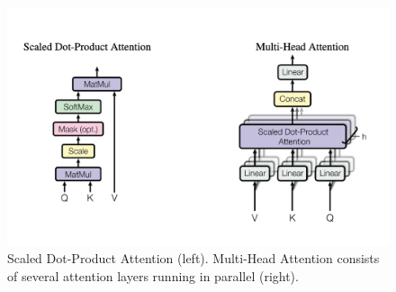 \begin{figure}[H]
	\centering
	\includegraphics[width=12cm, keepaspectratio]{chapters/1_introduction/imgs/attention.png}
	\caption{Scaled Dot-Product Attention \cite{attention} (left). Multi-Head Attention \cite{attention} consists of several attention layers running in parallel (right).}
	\label{fig:attention}
\end{figure}
%
